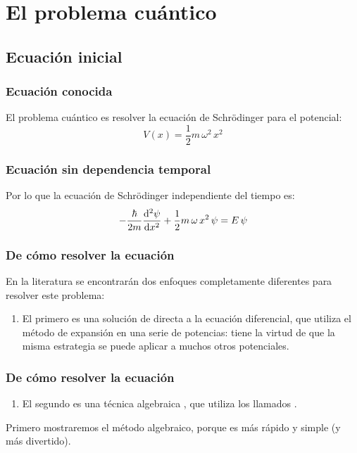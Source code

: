 \documentclass[12pt]{beamer}
\begin{document}
\section{El problema cuántico}
\subsection{Ecuación inicial}

\begin{frame}
\frametitle{Ecuación conocida}
El problema cuántico es resolver la ecuación de Schrödinger para el potencial:
\pause
\begin{equation}
V(x) = \dfrac{1}{2} m \, \omega^{2} \, x^{2}
\label{eq:ecuacion_02_038}
\end{equation}
\end{frame}
\begin{frame}
\frametitle{Ecuación sin dependencia temporal}
Por lo que la ecuación de Schrödinger independiente del tiempo es:
\pause
\begin{equation}
- \dfrac{\hbar}{2 m} \dv[2]{\psi}{x} + \dfrac{1}{2} m \, \omega \, x^{2} \, \psi = E \, \psi
\label{eq:ecuacion_02_039}
\end{equation}
\end{frame}
\begin{frame}
\frametitle{De cómo resolver la ecuación}
En la literatura se encontrarán dos enfoques completamente diferentes para resolver este problema:
\begin{enumerate}[<+->]
\item El primero es una solución de  directa a la ecuación diferencial, que utiliza el método de expansión en una serie de potencias: \pause tiene la virtud de que la misma estrategia se puede aplicar a muchos otros potenciales.
\seti
\end{enumerate}
\end{frame}
\begin{frame}
\frametitle{De cómo resolver la ecuación}
\begin{enumerate}[<+->]
\conti
\item El segundo es una técnica algebraica , que utiliza los llamados .
\end{enumerate}
\pause
Primero mostraremos el método algebraico, porque es más rápido y simple (y más divertido).
\end{frame}
\end{document}
